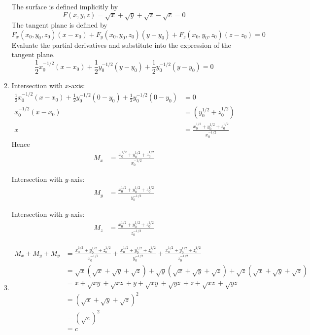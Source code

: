 \documentclass[11pt]{article}
\begin{document}
\begin{enumerate}
\begin{enumerate}
        The surface is defined implicitly by
        $$
        F(x,y,z) = \sqrt x + \sqrt y + \sqrt z - \sqrt c = 0
        $$
        The tangent plane is defined by
        $$
        F_x(x_0,y_0,z_0)(x-x_0) + F_y(x_0,y_0,z_0)(y-y_0) + F_z(x_0,y_0,z_0)(z-z_0) = 0
        $$
        Evaluate the partial derivatives and substitute into the expression of the tangent plane.
        $$
        \frac{1}{2}x_0^{-1/2}(x-x_0) + \frac{1}{2}y_0^{-1/2}(y-y_0) + \frac{1}{2}y_0^{-1/2}(y-y_0) = 0
        $$
        
        \item 
        
        Intersection with $x$-axis:
        $$
        \begin{aligned}
            \frac{1}{2}x_0^{-1/2}(x-x_0) + \frac{1}{2}y_0^{-1/2}(0-y_0) + \frac{1}{2}y_0^{-1/2}(0-y_0) &= 0 \\
            x_0^{-1/2}(x-x_0) &= (y_0^{1/2}+z_0^{1/2}) \\
            x &= \frac{x_0^{1/2}+y_0^{1/2}+z_0^{1/2}}{x_0^{-1/2}}
        \end{aligned}
        $$
        Hence
        $$
        \begin{aligned}
            M_x &= \frac{x_0^{1/2}+y_0^{1/2}+z_0^{1/2}}{x_0^{-1/2}}
        \end{aligned}
        $$
        
        Intersection with $y$-axis:
        $$
        \begin{aligned}
            M_y &= \frac{x_0^{1/2}+y_0^{1/2}+z_0^{1/2}}{y_0^{-1/2}}
        \end{aligned}
        $$
        
        Intersection with $y$-axis:
        $$
        \begin{aligned}
            M_z &= \frac{x_0^{1/2}+y_0^{1/2}+z_0^{1/2}}{z_0^{-1/2}}
        \end{aligned}
        $$
        
        \item
        $$
        \begin{aligned}
            M_x+M_y+M_y &= \frac{x_0^{1/2}+y_0^{1/2}+z_0^{1/2}}{x_0^{-1/2}} + \frac{x_0^{1/2}+y_0^{1/2}+z_0^{1/2}}{y_0^{-1/2}} + \frac{x_0^{1/2}+y_0^{1/2}+z_0^{1/2}}{z_0^{-1/2}} \\
            &= \sqrt{x} (\sqrt{x}+\sqrt{y}+\sqrt{z}) + \sqrt{y} (\sqrt{x}+\sqrt{y}+\sqrt{z}) + \sqrt{z} (\sqrt{x}+\sqrt{y}+\sqrt{z}) \\
            &= x + \sqrt{xy} + \sqrt{xz} + y + \sqrt{xy} + \sqrt{yz} + z + \sqrt{xz} + \sqrt{yz} \\
            &= (\sqrt{x}+\sqrt{y}+\sqrt{z})^2 \\
            &= (\sqrt{c})^2 \\
            &= c
        \end{aligned}
        $$
    \end{enumerate}
    

\end{enumerate}
\end{document}
